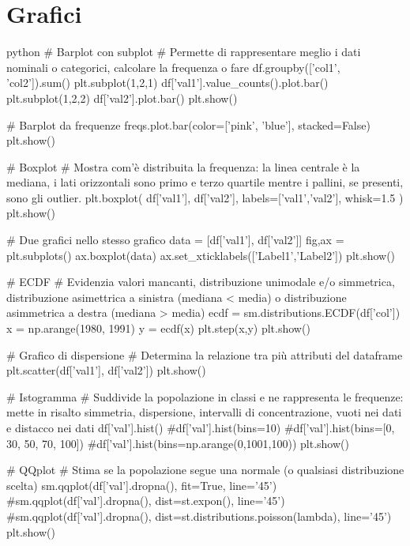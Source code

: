 \documentclass[11pt]{report}
\begin{document}
\section{Grafici}
\begin{mintedbox}{python}
# Barplot con subplot
# Permette di rappresentare meglio i dati nominali o categorici, calcolare la frequenza o fare df.groupby(['col1', 'col2']).sum()
plt.subplot(1,2,1)
df['val1'].value_counts().plot.bar()
plt.subplot(1,2,2)
df['val2'].plot.bar()
plt.show()

# Barplot da frequenze
freqs.plot.bar(color=['pink', 'blue'], stacked=False)
plt.show()

# Boxplot
# Mostra com'è distribuita la frequenza: la linea centrale è la mediana, i lati orizzontali sono primo e terzo quartile mentre i pallini, se presenti, sono gli outlier.
plt.boxplot(
    df['val1'],
    df['val2'],
    labels=['val1','val2'],
    whisk=1.5
)
plt.show()

# Due grafici nello stesso grafico
data = [df['val1'], df['val2']]
fig,ax = plt.subplots()
ax.boxplot(data)
ax.set_xticklabels(['Label1','Label2'])
plt.show()

# ECDF
# Evidenzia valori mancanti, distribuzione unimodale e/o simmetrica, distribuzione asimettrica a sinistra (mediana < media) o distribuzione asimmetrica a destra (mediana > media)
ecdf = sm.distributions.ECDF(df['col'])
x = np.arange(1980, 1991)
y = ecdf(x)
plt.step(x,y)
plt.show()

# Grafico di dispersione
# Determina la relazione tra più attributi del dataframe
plt.scatter(df['val1'], df['val2'])
plt.show()

# Istogramma
# Suddivide la popolazione in classi e ne rappresenta le frequenze: mette in risalto simmetria, dispersione, intervalli di concentrazione, vuoti nei dati e distacco nei dati
df['val'].hist()
#df['val'].hist(bins=10)
#df['val'].hist(bins=[0, 30, 50, 70, 100])
#df['val'].hist(bins=np.arange(0,1001,100))
plt.show()

# QQplot
# Stima se la popolazione segue una normale (o qualsiasi distribuzione scelta)
sm.qqplot(df['val'].dropna(), fit=True, line='45')
#sm.qqplot(df['val'].dropna(), dist=st.expon(), line='45')
#sm.qqplot(df['val'].dropna(), dist=st.distributions.poisson(lambda), line='45')
plt.show()
\end{mintedbox}
\end{document}
